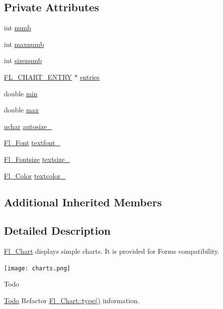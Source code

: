 \subsection*{Private Attributes}
\begin{DoxyCompactItemize}
\item 
int \hyperlink{class_fl___chart_af033c19ade7cdec77c379c1f755980f4}{numb}
\item 
int \hyperlink{class_fl___chart_ade398943b059e32513164d803ce56481}{maxnumb}
\item 
int \hyperlink{class_fl___chart_a593b47a2e2ffbf761b3081fc92bcb2ed}{sizenumb}
\item 
\hyperlink{struct_f_l___c_h_a_r_t___e_n_t_r_y}{F\+L\+\_\+\+C\+H\+A\+R\+T\+\_\+\+E\+N\+T\+RY} $\ast$ \hyperlink{class_fl___chart_a3b2e0cd0705c4533ce181692d9e5f082}{entries}
\item 
double \hyperlink{class_fl___chart_a4502e914dd2ceb9eec7aa76da3c976c3}{min}
\item 
double \hyperlink{class_fl___chart_a3b2f89659a39dccf2f8b465bb3440fdb}{max}
\item 
\hyperlink{fl__types_8h_a65f85814a8290f9797005d3b28e7e5fc}{uchar} \hyperlink{class_fl___chart_ae7cbf8e0f7915382b71a2c421fdc7c71}{autosize\+\_\+}
\item 
\hyperlink{_enumerations_8_h_a2ac46d9f082834b969fffe490a03a709}{Fl\+\_\+\+Font} \hyperlink{class_fl___chart_a561007869d07a9ddcfd5f60175995eb2}{textfont\+\_\+}
\item 
\hyperlink{_enumerations_8_h_ad58927f5c691454480f7cd28362502f1}{Fl\+\_\+\+Fontsize} \hyperlink{class_fl___chart_af17044fa38072aa107a5760681d98fb9}{textsize\+\_\+}
\item 
\hyperlink{_enumerations_8_h_a8b762953646f8abee866061f1af78a6a}{Fl\+\_\+\+Color} \hyperlink{class_fl___chart_a258c1c3ebeb9339af1092f9d09a0bd34}{textcolor\+\_\+}
\end{DoxyCompactItemize}
\subsection*{Additional Inherited Members}


\subsection{Detailed Description}
\hyperlink{class_fl___chart}{Fl\+\_\+\+Chart} displays simple charts. It is provided for Forms compatibility. 

 
\begin{DoxyImage}
\texttt{[image: charts.png]}
\end{DoxyImage}
 \begin{DoxyRefDesc}{Todo}
\item[\hyperlink{todo__todo000010}{Todo}]Refactor \hyperlink{class_fl___widget_adda2e8f162b3ea0332eb8d762350bbd5}{Fl\+\_\+\+Chart\+::type()} information.\end{DoxyRefDesc}


